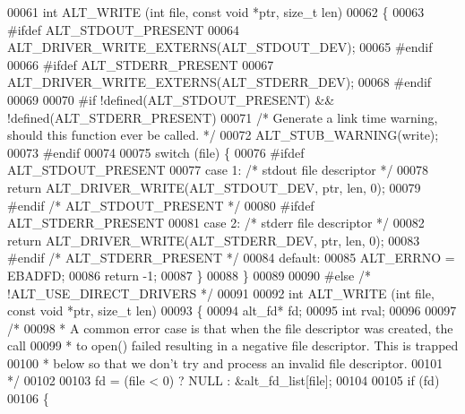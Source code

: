 \begin{DoxyCode}
00061 \textcolor{keywordtype}{int} ALT_WRITE (\textcolor{keywordtype}{int} file, \textcolor{keyword}{const} \textcolor{keywordtype}{void} *ptr, \textcolor{keywordtype}{size\_t} len)
00062 \{
00063 \textcolor{preprocessor}{#ifdef ALT\_STDOUT\_PRESENT}
00064     ALT_DRIVER_WRITE_EXTERNS(ALT_STDOUT_DEV);
00065 \textcolor{preprocessor}{#endif}
00066 \textcolor{preprocessor}{#ifdef ALT\_STDERR\_PRESENT}
00067     ALT_DRIVER_WRITE_EXTERNS(ALT_STDERR_DEV);
00068 \textcolor{preprocessor}{#endif}
00069 
00070 \textcolor{preprocessor}{#if !defined(ALT\_STDOUT\_PRESENT) && !defined(ALT\_STDERR\_PRESENT)}
00071     \textcolor{comment}{/* Generate a link time warning, should this function ever be called. */}
00072     ALT_STUB_WARNING(write);
00073 \textcolor{preprocessor}{#endif}
00074 
00075     \textcolor{keywordflow}{switch} (file) \{
00076 \textcolor{preprocessor}{#ifdef ALT\_STDOUT\_PRESENT}
00077     \textcolor{keywordflow}{case} 1: \textcolor{comment}{/* stdout file descriptor */}
00078         \textcolor{keywordflow}{return} ALT_DRIVER_WRITE(ALT_STDOUT_DEV, ptr, len, 0);
00079 \textcolor{preprocessor}{#endif }\textcolor{comment}{/* ALT\_STDOUT\_PRESENT */}\textcolor{preprocessor}{}
00080 \textcolor{preprocessor}{#ifdef ALT\_STDERR\_PRESENT}
00081     \textcolor{keywordflow}{case} 2: \textcolor{comment}{/* stderr file descriptor */}
00082         \textcolor{keywordflow}{return} ALT_DRIVER_WRITE(ALT_STDERR_DEV, ptr, len, 0);
00083 \textcolor{preprocessor}{#endif }\textcolor{comment}{/* ALT\_STDERR\_PRESENT */}\textcolor{preprocessor}{}
00084     \textcolor{keywordflow}{default}:
00085         ALT_ERRNO = EBADFD;
00086         \textcolor{keywordflow}{return} -1;
00087     \}
00088 \}
00089 
00090 \textcolor{preprocessor}{#else }\textcolor{comment}{/* !ALT\_USE\_DIRECT\_DRIVERS */}\textcolor{preprocessor}{}
00091 
00092 \textcolor{keywordtype}{int} ALT_WRITE (\textcolor{keywordtype}{int} file, \textcolor{keyword}{const} \textcolor{keywordtype}{void} *ptr, \textcolor{keywordtype}{size\_t} len)
00093 \{
00094   alt_fd*  fd;
00095   \textcolor{keywordtype}{int}      rval;
00096 
00097   \textcolor{comment}{/*}
00098 \textcolor{comment}{   * A common error case is that when the file descriptor was created, the call}
00099 \textcolor{comment}{   * to open() failed resulting in a negative file descriptor. This is trapped}
00100 \textcolor{comment}{   * below so that we don't try and process an invalid file descriptor.}
00101 \textcolor{comment}{   */}
00102 
00103   fd = (file < 0) ? NULL : &alt_fd_list[file];
00104   
00105   \textcolor{keywordflow}{if} (fd)
00106   \{

\end{DoxyCode}
